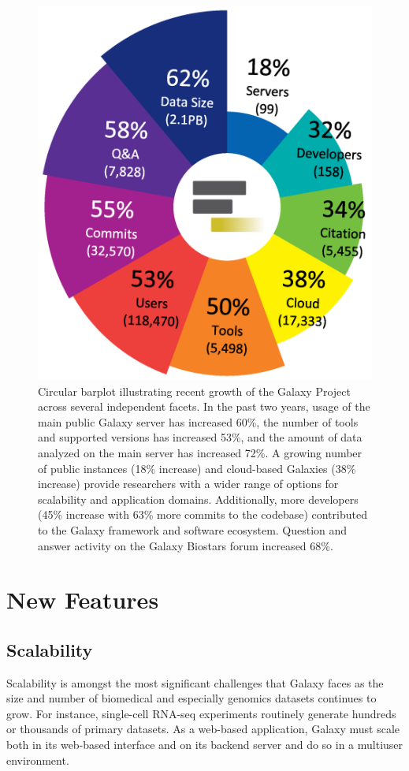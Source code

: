 \begin{figure}[ht!]
\centering
\includegraphics[]{chapters/images/galaxy/galaxy-growth.png}
\caption{Circular barplot illustrating recent growth of the Galaxy Project across several independent facets. In the past two years, usage of the main public Galaxy server has increased 60\%, the number of tools and supported versions has increased 53\%, and the amount of data analyzed on the main server has increased 72\%. A growing number of public instances (18\% increase) and cloud-based Galaxies (38\% increase) provide researchers with a wider range of options for scalability and application domains. Additionally, more developers (45\% increase with 63\% more commits to the codebase) contributed to the Galaxy framework and software ecosystem. Question and answer activity on the Galaxy Biostars forum increased 68\%.}
\label{fig:growth}
\end{figure}

\section*{New Features}
\subsection*{Scalability}
Scalability is amongst the most significant challenges that Galaxy faces as the size and number of biomedical and especially genomics datasets continues to grow. For instance, single-cell RNA-seq experiments routinely generate hundreds or thousands of primary datasets. As a web-based application, Galaxy must scale both in its web-based interface and on its backend server and do so in a multiuser environment.

